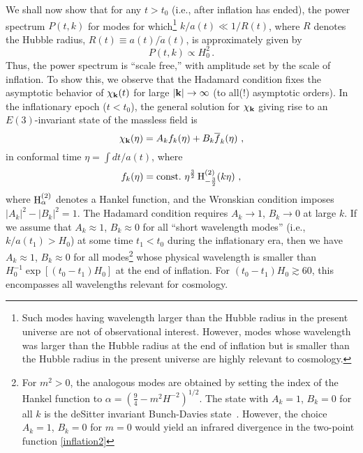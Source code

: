 \documentclass[12pt]{article}
\newcommand{\e}{{\rm e}}
\renewcommand{\k}{{\bf k}}
\theoremstyle{plain}
\theoremstyle{definition}
\def\ben{\begin{equation}}
\def\een{\end{equation}}
\begin{document}
We shall now show that for any $t > t_0$ (i.e., after inflation has ended),
the power spectrum $P(t,k)$ for modes for which\footnote{Such modes having wavelength larger than the Hubble radius in the present universe are not of observational interest. However, modes whose wavelength was larger than the Hubble radius at the end of inflation but is smaller than the Hubble radius in the present universe are highly relevant to cosmology.} $k/a(t) \ll 1/R(t)$, where $R$ denotes
the Hubble radius, $R(t) \equiv a(t)/\dot a(t)$, is
approximately given by
\ben\label{ps}
P(t,k) \propto H_0^2 \, .
\een
Thus, the power spectrum is ``scale free,'' with amplitude set by the scale of inflation.
To show this, we observe that
the Hadamard condition fixes the asymptotic behavior of
$\chi_{\bf k}(t)$ for large $|{\bf k}| \to \infty$ (to all(!)
asymptotic orders). In the inflationary epoch ($t < t_0$), the general solution for $\chi_\k$
giving rise to an $E(3)$-invariant state of the massless field is
\ben\label{deSmodes}
\chi_{\bf k}(\eta) =
A_{k} f_k(\eta) +
B_{k} \overline{f}_k(\eta) \ ,
\een
in conformal time $\eta =\int dt/a(t)$,
where
\ben\label{deSm1}
f_k(\eta) = {\rm const.}  \ \eta^{\frac{3}{2}} \, {\rm H}_{-\frac{3}{2}}^{(2)}(k\eta) \ ,
\een
where
${\rm H}_{\alpha}^{(2)}$ denotes a Hankel function,
and the Wronskian condition imposes $|A_k|^2-|B_k|^2=1$. The
Hadamard condition requires $A_k \to 1$, $B_k \to 0$ at large $k$.
If we assume that $A_k \approx 1$, $B_k \approx 0$ for all ``short wavelength
modes'' (i.e., $k/a(t_1) > H_0$) at some time $t_1 < t_0$ during the inflationary
era, then we have $A_k \approx 1$, $B_k \approx 0$ for all modes\footnote{
For $m^2>0$, the analogous modes are obtained by setting the index of
the Hankel function to
$\alpha = (\frac{9}{4}-m^2H^{-2})^{1/2}$. The state with $A_k = 1$, $B_k = 0$
for all $k$ is the deSitter
invariant Bunch-Davies state~\cite{spindel}. However, the choice $A_k = 1$, $B_k = 0$
for $m=0$ would yield an infrared divergence in the two-point function \eqref{inflation2}}  whose
physical wavelength is smaller than $H_0^{-1} \exp[(t_0 - t_1) H_0]$ at the end
of inflation. For $(t_0 - t_1) H_0 \gtrsim 60$, this encompasses all wavelengths
relevant for cosmology.
\end{document}
